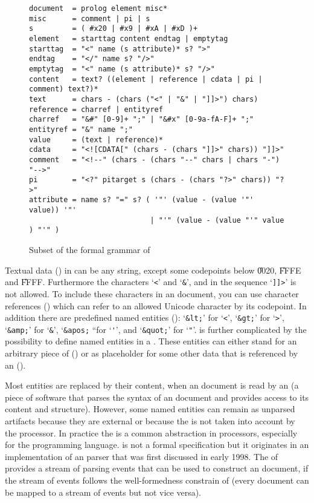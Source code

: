 \begin{figure}[h]
\centering
\begin{lstlisting}[language=BNF]
document  = prolog element misc*
misc      = comment | pi | s
s         = ( #x20 | #x9 | #xA | #xD )+
element   = starttag content endtag | emptytag
starttag  = "<" name (s attribute)* s? ">" 
endtag    = "</" name s? "/>"
emptytag  = "<" name (s attribute)* s? "/>"
content   = text? ((element | reference | cdata | pi | comment) text?)*
text      = chars - (chars ("<" | "&" | "]]>") chars)
reference = charref | entityref
charref   = "&#" [0-9]+ ";" | "&#x" [0-9a-fA-F]+ ";"
entityref = "&" name ";"
value     = (text | reference)*
cdata     = "<![CDATA[" (chars - (chars "]]>" chars)) "]]>"
comment   = "<!--" (chars - (chars "--" chars | chars "-") "-->"
pi        = "<?" pitarget s (chars - (chars "?>" chars)) "?>"
attribute = name s? "=" s? ( '"' (value - (value '"' value)) '"' 
                            | "'" (value - (value "'" value ) "'" )
\end{lstlisting}
\caption{Subset of the formal grammar of }
\label{fig:xmlbnf}
\end{figure}

Textual data () in  can be any  
string, except some codepoints below \U{0020}, \U{FFFE} and \U{FFFF}. 
Furthermore the characters `\verb|<|' and `\verb|&|', and in 
the sequence `\verb|]]>|' is not allowed. To include these characters
in an  document, you can use character references ()
which can refer to an allowed Unicode character by its  codepoint.
In addition there are predefined named entities (): `\verb|&lt;|'
for `\verb|<|', `\verb|&gt;|' for `\verb|>|', `\verb|&amp;|' for `\verb|&|', 
`\verb|&apos;| ``for `\verb|'|', and `\verb|&quot;|' for `\verb|"|'.
 is further complicated by the possibility to define named entities
in a . These entities can either stand for an arbitrary piece 
of  () or as placeholder for some other data
that is referenced by an  ().

Most entities are replaced by their content, when an  document is
read by an  (a piece of software that parses the syntax
of an  document and provides access to its content and structure). 
However, some named entities can remain as unparsed artifacts because they 
are external or because the  is not taken into account by the
processor. In practice the  \cite{Megginson2004}
\label{note:sax}
is a common abstraction in  processors, especially for the  
programming language.  is not a formal specification but it originates
in an implementation of an  parser that was first discussed in early
1998. The  of  provides a stream of parsing events that can
be used to construct an  document, if the stream of events follows the
well-formedness constrain of  (every  document can be mapped
to a stream of  events but not vice versa).


